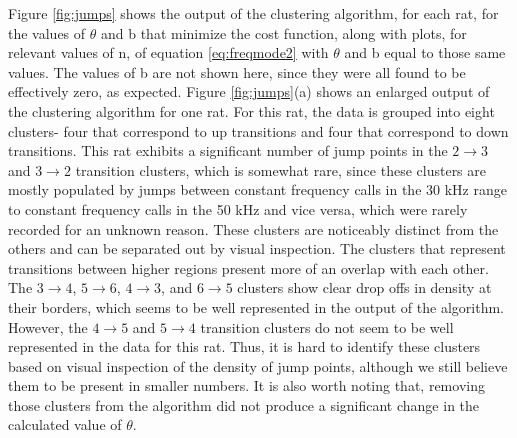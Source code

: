 \documentclass[twocolumn, prX]{revtex4}
\begin{document}
Figure \ref{fig:jumps} shows the output of the clustering algorithm, for each rat, for the values of $\theta$ and b that minimize the cost function, along with plots, for relevant values of n, of equation \ref{eq:freqmode2} with $\theta$ and b equal to those same values. The values of b are not shown here, since they were all found to be effectively zero, as expected. Figure \ref{fig:jumps}(a) shows an enlarged output of the clustering algorithm for one rat. For this rat, the data is grouped into eight clusters- four that correspond to up transitions and four that correspond to down transitions. This rat exhibits a significant number of jump points in the $2\rightarrow3$ and $3\rightarrow2$ transition clusters, which is somewhat rare, since these clusters are mostly populated by jumps between constant frequency calls in the 30 kHz range to constant frequency calls in the 50 kHz and vice versa, which were rarely recorded for an unknown reason. These clusters are noticeably distinct from the others and can be separated out by visual inspection. The clusters that represent transitions between higher regions present more of an overlap with each other. The $3\rightarrow4$, $5\rightarrow6$, $4\rightarrow3$, and $6\rightarrow5$ clusters show clear drop offs in density at their borders, which seems to be well represented in the output of the algorithm. However, the $4\rightarrow5$ and $5\rightarrow4$ transition clusters do not seem to be well represented in the data for this rat. Thus, it is hard to identify these clusters based on visual inspection of the density of jump points, although we still believe them to be present in smaller numbers. It is also worth noting that, removing those clusters from the algorithm did not produce a significant change in the calculated value of $\theta$. 
\end{document}
